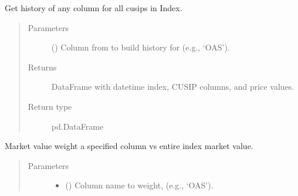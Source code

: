 \documentclass[letterpaper,10pt,english]{report}
\begin{document}
\begin{fulllineitems}
\begin{fulllineitems}
\begin{quote}
\begin{description}
\end{description}\end{quote}

\end{fulllineitems}


\begin{fulllineitems}
\label{\detokenize{index:lgimapy.index.Index.get_value_history}}
Get history of any column for all cusips in Index.
\begin{quote}\begin{description}
\item[{Parameters}] \leavevmode
{} () \textendash{} Column from  to build history for (e.g., ‘OAS’).

\item[{Returns}] \leavevmode
{} \textendash{} DataFrame with datetime index, CUSIP columns, and price values.

\item[{Return type}] \leavevmode
pd.DataFrame

\end{description}\end{quote}

\end{fulllineitems}


\begin{fulllineitems}
\label{\detokenize{index:lgimapy.index.Index.market_value_weight}}
Market value weight a specified column vs entire index market value.
\begin{quote}\begin{description}
\item[{Parameters}] \leavevmode\begin{itemize}
\item {} 
 () \textendash{} Column name to weight, (e.g., ‘OAS’).


\end{itemize}
\end{description}
\end{quote}
\end{fulllineitems}
\end{fulllineitems}
\end{document}
